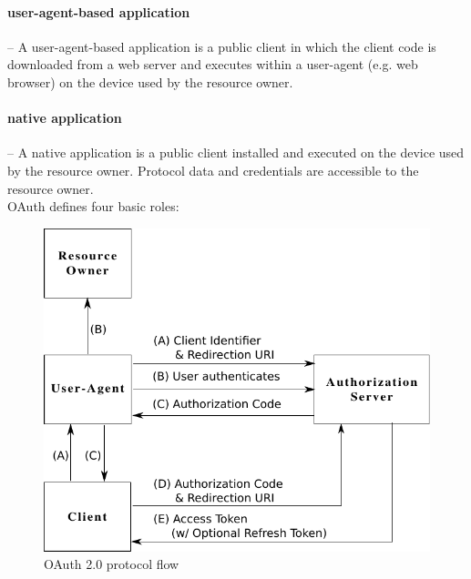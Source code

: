 \documentclass[a4paper]{llncs}
\begin{document}
\paragraph*{user-agent-based application} -- A user-agent-based application is a public client in which the client code is downloaded from a web server and executes within a user-agent (e.g. web browser) on the device used by the resource owner.

\paragraph*{native application} -- A native application is a public client installed and executed on the device used by the resource owner. Protocol data and credentials are accessible to the resource owner.\\

OAuth defines four basic roles: 

\begin{figure}[htb]
  \centering
  \includegraphics[width=\textwidth]{Oauth2.pdf}
  \caption{OAuth 2.0 protocol flow}
  \label{fig:oauth2flow}
\end{figure}
\end{document}
